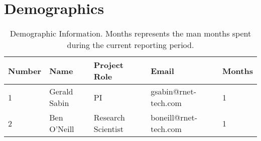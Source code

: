 \section{Demographics}
\begin{table}[h!]
\begin{tabular}{lllll}
 \toprule
 Number & Name & Project Role  & Email & Months  \\
 \midrule 
 1 & Gerald Sabin              & PI                  & gsabin@rnet-tech.com      & 1 \\
 2 & Ben O'Neill               & Research  Scientist & boneill@rnet-tech.com     & 1 \\
 
\bottomrule
 \end{tabular}
 \caption{ Demographic Information. Months represents the man months spent during the current reporting period. \label{tab:demographics}} 
\end{table}

